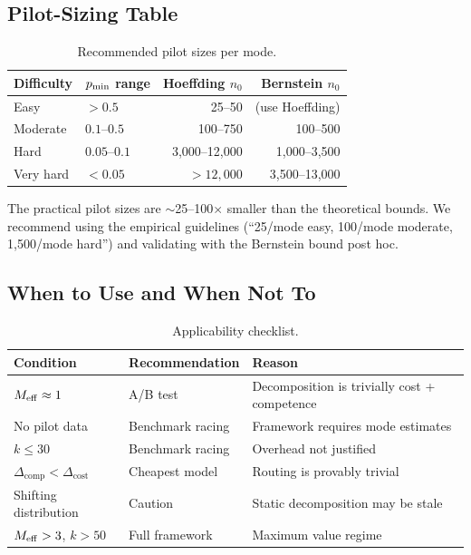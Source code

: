 \subsection{Pilot-Sizing Table}

\begin{table}[h]
\centering
\caption{Recommended pilot sizes per mode.}
\label{tab:pilot-sizing}
\begin{tabular}{llrr}
\toprule
Difficulty & $p_{\min}$ range & Hoeffding $n_0$ & Bernstein $n_0$ \\
\midrule
Easy & $> 0.5$ & 25--50 & (use Hoeffding) \\
Moderate & $0.1$--$0.5$ & 100--750 & 100--500 \\
Hard & $0.05$--$0.1$ & 3{,}000--12{,}000 & 1{,}000--3{,}500 \\
Very hard & $< 0.05$ & $> 12{,}000$ & 3{,}500--13{,}000 \\
\bottomrule
\end{tabular}
\end{table}

The practical pilot sizes are $\sim$25--100$\times$ smaller than the theoretical bounds.
We recommend using the empirical guidelines (``25/mode easy, 100/mode moderate, 1{,}500/mode hard'') and validating with the Bernstein bound post hoc.

\subsection{When to Use and When Not To}

\begin{table}[h]
\centering
\caption{Applicability checklist.}
\label{tab:applicability}
\begin{tabular}{lll}
\toprule
Condition & Recommendation & Reason \\
\midrule
$M_{\mathrm{eff}} \approx 1$ & A/B test & Decomposition is trivially cost + competence \\
No pilot data & Benchmark racing & Framework requires mode estimates \\
$k \le 30$ & Benchmark racing & Overhead not justified \\
$\Delta_{\mathrm{comp}} < \Delta_{\mathrm{cost}}$ & Cheapest model & Routing is provably trivial \\
Shifting distribution & Caution & Static decomposition may be stale \\
$M_{\mathrm{eff}} > 3$, $k > 50$ & Full framework & Maximum value regime \\
\bottomrule
\end{tabular}
\end{table}

